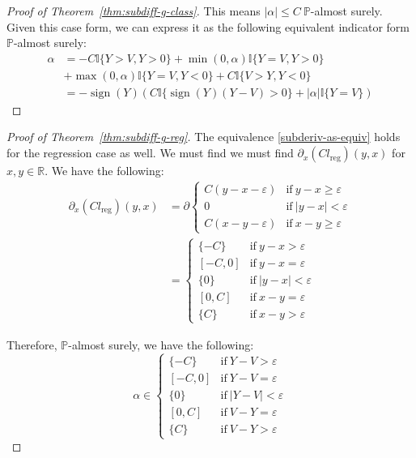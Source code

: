 \documentclass{article}
\begin{document}
\begin{proof}[Proof of Theorem~\ref{thm:subdiff-g-class}]
This means $|\alpha| \leq C \ \mathbb{P}$-almost surely. Given this case form, we can express it as the following equivalent indicator form $\mathbb{P}$-almost surely:
\begin{align}
    \alpha & = -C \mathbb{I}\{Y>V, Y>0\} + \min(0,\alpha) \mathbb{I}\{Y=V, Y>0\} \\
    & + \max(0,\alpha) \mathbb{I}\{Y=V, Y<0\} + C\mathbb{I}\{V>Y, Y<0\}\\
    & = -\operatorname{sign}(Y)(C\mathbb{I}\{\operatorname{sign}(Y)(Y-V) > 0\} + |\alpha| \mathbb{I}\{Y=V\})
\end{align}
    
\end{proof}

\begin{proof}[Proof of Theorem~\ref{thm:subdiff-g-reg}]
The equivalence \ref{subderiv-as-equiv} holds for the regression case as well. We must find we must find $\partial_x(Cl_\text{reg})(y,x)$ for $x,y \in \mathbb{R}$. We have the following:
\begin{align}
    \partial_x(Cl_\text{reg})(y,x) & = \partial\begin{cases}
        C (y-x-\varepsilon) &\text{if}\ y -x\ge \varepsilon\\
        0 &\text{if} \ |y-x|<\varepsilon\\
        C(x-y-\varepsilon) &\text{if} \ x-y \ge \varepsilon
    \end{cases}\\
    &= \begin{cases}
        \{-C\} &\text{if} \ y -x> \varepsilon  \\
        [-C, 0] &\text{if} \ y -x= \varepsilon \\
        \{0\} &\text{if} \ |y-x|<\varepsilon\\
        [0,C] &\text{if} \ x -y= \varepsilon \\
        \{C\} &\text{if} \ x -y> \varepsilon
    \end{cases}
\end{align}

Therefore, $\mathbb{P}$-almost surely, we have the following:
\begin{equation}
    \alpha \in \begin{cases}
        \{-C\} &\text{if} \ Y -V> \varepsilon  \\
        [-C, 0] &\text{if} \ Y -V= \varepsilon \\
        \{0\} &\text{if} \ |Y-V|<\varepsilon\\
        [0,C] &\text{if} \ V -Y= \varepsilon \\
        \{C\} &\text{if} \ V -Y> \varepsilon
    \end{cases}
\end{equation}


\end{proof}
\end{document}
